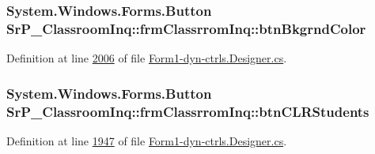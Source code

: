 \hypertarget{class_sr_p___classroom_inq_1_1frm_classrrom_inq_a658aa508b7219ac91df61ae4e5b61e90}{
\subsubsection[{btn\-Bkgrnd\-Color}]{\setlength{\rightskip}{0pt plus 5cm}\-System.\-Windows.\-Forms.\-Button {\bf \-Sr\-P\-\_\-\-Classroom\-Inq\-::frm\-Classrrom\-Inq\-::btn\-Bkgrnd\-Color}}}
\label{class_sr_p___classroom_inq_1_1frm_classrrom_inq_a658aa508b7219ac91df61ae4e5b61e90}


\-Definition at line \hyperlink{_form1-dyn-ctrls_8_designer_8cs_source_l02006}{2006} of file \hyperlink{_form1-dyn-ctrls_8_designer_8cs_source}{\-Form1-\/dyn-\/ctrls.\-Designer.\-cs}.

\hypertarget{class_sr_p___classroom_inq_1_1frm_classrrom_inq_ad2bdef2e6f826a27d003c1a0df8bd2be}{
\subsubsection[{btn\-C\-L\-R\-Students}]{\setlength{\rightskip}{0pt plus 5cm}\-System.\-Windows.\-Forms.\-Button {\bf \-Sr\-P\-\_\-\-Classroom\-Inq\-::frm\-Classrrom\-Inq\-::btn\-C\-L\-R\-Students}}}
\label{class_sr_p___classroom_inq_1_1frm_classrrom_inq_ad2bdef2e6f826a27d003c1a0df8bd2be}


\-Definition at line \hyperlink{_form1-dyn-ctrls_8_designer_8cs_source_l01947}{1947} of file \hyperlink{_form1-dyn-ctrls_8_designer_8cs_source}{\-Form1-\/dyn-\/ctrls.\-Designer.\-cs}.

